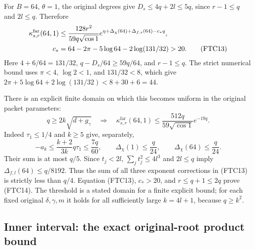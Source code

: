For $B=64$, $\theta=1$, the original degrees give
$D_s\le4q+2l\le5q$, since $r-1\le q$ and $2l\le q$.
Therefore
\begin{align}
 \kappa_{s,r}^{\mathrm{far}}(64,1)
 &\le\frac{128r^2}{59q\sqrt{\cos1}}
 e^{\eta+\Delta_\chi(64)+\Delta_{f,s}(64)-c_*q},\notag\\
 c_*&=64-2\pi-5\log64-2\log(131/32)>20.
 \tag{FTC13}
\end{align}
Here $4+6/64=131/32$, $q-D_s/64\ge59q/64$, and $r-1\le q$.
The strict numerical bound uses $\pi<4$, $\log2<1$, and $131/32<8$,
which give $2\pi+5\log64+2\log(131/32)<8+30+6=44$.

There is an explicit finite domain on which this becomes uniform in
the original packet parameters:
\begin{equation}
 q\ge2k\sqrt{d+g_\gamma}
 \quad\Longrightarrow\quad
 \kappa_{s,r}^{\mathrm{far}}(64,1)
 \le\frac{512q}{59\sqrt{\cos1}}e^{-19q}.
 \tag{FTC14}
\end{equation}
Indeed $\tau_1\le1/4$ and $k\ge5$ give, separately,
\[
 -a_k\le\frac{k+2}{3k}q\tau_1\le\frac{7q}{60},\qquad
 \Delta_\chi(1)\le\frac q{24},\qquad
 \Delta_\chi(64)\le\frac q{24}.
\]
Their sum is at most $q/5$.  Since $t_j<2l$,
$\sum_jt_j^2\le4l^3$ and $2l\le q$ imply
$\Delta_{f,l}(64)\le q/8192$.  Thus the sum of all three exponent
corrections in (FTC13) is strictly less than $q/4$.
Equation (FTC13), $c_*>20$, and $r\le q+1\le2q$ prove (FTC14).
The threshold is a stated domain for a finite explicit bound; for each
fixed original $\delta,\gamma,m$ it holds for all sufficiently large
$k=4l+1$, because $q\ge k^2$.

\subsection{Inner interval: the exact original-root product bound}

